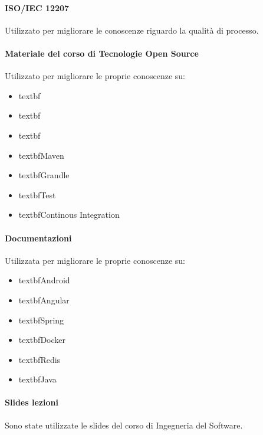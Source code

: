 \paragraph{ISO/IEC 12207}
Utilizzato per migliorare le conoscenze riguardo la qualità di processo.
\paragraph{Materiale del corso di Tecnologie Open Source}
Utilizzato per migliorare le proprie conoscenze su:
\begin{itemize}
	\item textbf{}
	\item textbf{}
	\item textbf{}
	\item textbf{Maven}
	\item textbf{Grandle}
	\item textbf{Test}
	\item textbf{Continous Integration}
\end{itemize}
\paragraph{Documentazioni}
Utilizzata per migliorare le proprie conoscenze su:
\begin{itemize}
	\item textbf{Android}
	\item textbf{Angular}
	\item textbf{Spring}
	\item textbf{Docker}
	\item textbf{Redis}
	\item textbf{Java}
\end{itemize}
\paragraph{Slides lezioni}
Sono state utilizzate le slides del corso di Ingegneria del Software. 
